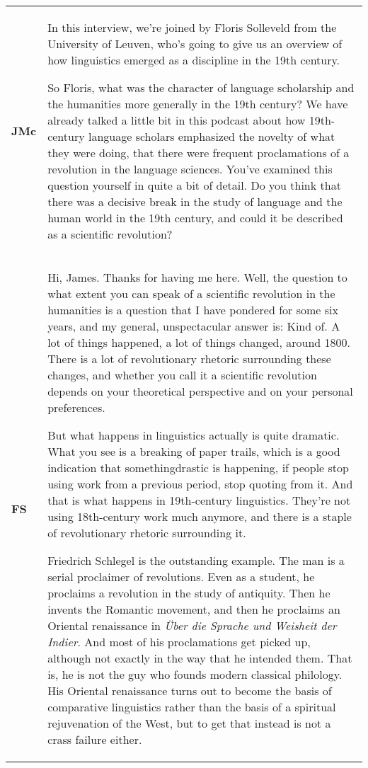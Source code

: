 \documentclass[12pt]{article}
\begin{document}
\begin{flushleft}
\tablefirsthead{}
\tablehead{}
\tabletail{}
\tablelasttail{}
\begin{supertabular}{m{0.24415985in}m{5.89766in}}
\textbf{JMc}\newline
 &
In this interview, we’re joined by Floris Solleveld from the University of Leuven, who’s going to give us an overview of how linguistics emerged as a discipline in the 19th century. \ 

So Floris, what was the character of language scholarship and the humanities more generally in the 19th century? We have already talked a little bit in this podcast about how 19th-century language scholars emphasized the novelty of what they were doing, that there were frequent proclamations of a revolution in the language sciences. You’ve examined this question yourself in quite a bit of detail. Do you think that there was a decisive break in the study of language and the human world in the 19th century, and could it be described as a scientific revolution?\\
\textbf{FS}\newline
 &
Hi, James. Thanks for having me here. Well, the question to what extent you can speak of a scientific revolution in the humanities is a question that I have pondered for some six years, and my general, unspectacular answer is: Kind of. A lot of things happened, a lot of things changed, around 1800. There is a lot of revolutionary rhetoric surrounding these changes, and whether you call it a scientific revolution depends on your theoretical perspective and on your personal preferences. 

But what happens in linguistics actually is quite dramatic. What you see is a breaking of paper trails, which is a good indication that somethingdrastic is happening, if people stop using work from a previous period, stop quoting from it. And that is what happens in 19th-century linguistics. They’re not using 18th-century work much anymore, and there is a staple of revolutionary rhetoric surrounding it. 

Friedrich Schlegel is the outstanding example. The man is a serial proclaimer of revolutions. Even as a student, he proclaims a revolution in the study of antiquity. Then he invents the Romantic movement, and then he proclaims an Oriental renaissance in \textit{Über die Sprache und Weisheit der Indier}. And most of his proclamations get picked up, although not exactly in the way that he intended them. That is, he is not the guy who founds modern classical philology. His Oriental renaissance turns out to become the basis of comparative linguistics rather than the basis of a spiritual rejuvenation of the West, but to get that instead is not a crass failure either. 


\end{supertabular}
\end{flushleft}
\end{document}
